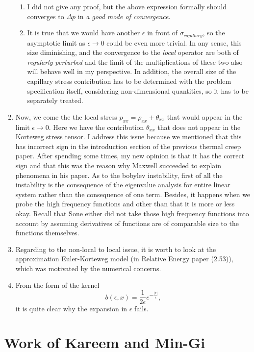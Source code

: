 \documentclass[a4paper,12pt]{article}
\begin{document}
\begin{enumerate}
\begin{enumerate}
\item I did not give any proof, but the above expression formally should converges to $\Delta p$ in {\it a good mode of convergence}.
\item It is true that we would have another $\epsilon$ in front of $\sigma_{capillary}$, so the asymptotic limit as $\epsilon \rightarrow 0$ could be even more trivial. In any sense, this size diminishing, and the convergence to the {\it local} operator are both of {\it regularly perturbed} and the limit of the multiplications of these two also will behave well in my perspective. In addition, the overall size of the capillary stress contribution has to be determined with the problem specification itself, considering non-dimensional quantities, so it has to be separately treated.
\end{enumerate}
\item Now, we come the the local stress $p_{xx} = \rho_{xx} + \theta_{xx}$ that would appear in the limit $\epsilon \rightarrow 0$. Here we have the contribution $\theta_{xx}$ that does not appear in the Korteweg stress tensor. I address this issue because we mentioned that this has incorrect sign in the introduction section of the previous thermal creep paper. After spending some times, my new opinion is that it has the correct sign and that this was the reason why Maxwell succeeded to explain phenomena in his paper. As to the bobylev instability, first of all the instability is the consequence of the eigenvalue analysis for entire linear system rather than the consequence of one term. Besides, it happens when we probe the high frequency functions and other than that it is more or less okay. Recall that Sone either did not take those high frequency functions into account by assuming derivatives of functions are of comparable size to the functions themselves.

\item Regarding to the non-local to local issue, it is worth to look at the approximation Euler-Korteweg model (in Relative Energy paper (2.53)), which was motivated by the numerical concerns.

\item From the form of the kernel 
$$ b(\epsilon,x) = \frac{1}{2\epsilon} e^{-\frac{|x|}{\epsilon}}, $$
it is quite clear why the expansion in $\epsilon$ fails.
\end{enumerate}


\section{Work of Kareem and Min-Gi}
\end{document}

